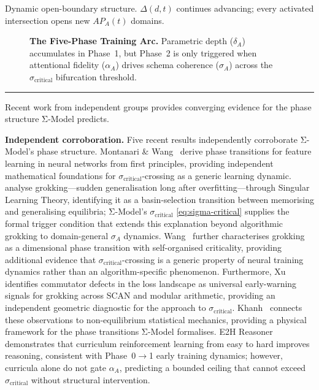 \documentclass[11pt,a4paper]{article}
\begin{document}
Dynamic open-boundary structure. $\Delta(d,t)$ continues advancing;
every activated intersection opens new $AP_A(t)$ domains.

\begin{figure}[htbp]
\centering
\resizebox{\textwidth}{!}{}
\caption{\textbf{The Five-Phase Training Arc.} Parametric depth
($\delta_A$) accumulates in Phase~1, but Phase~2 is only triggered when
attentional fidelity ($\alpha_A$) drives schema coherence ($\sigma_A$)
across the $\sigma_{\text{critical}}$ bifurcation threshold.}
\label{fig:phases}
\end{figure}

\noindent\rule{\linewidth}{0.4pt}

Recent work from independent groups provides converging evidence for the phase structure Σ-Model predicts.

\textbf{Independent corroboration.} Five recent results independently
corroborate Σ-Model's phase structure. Montanari \& Wang~\cite{montanari2026}
derive phase transitions for feature learning in neural networks from first
principles, providing independent mathematical foundations for
$\sigma_{\text{critical}}$-crossing as a generic learning dynamic.
\citet{cullen2026basinselectiongrokking} analyse grokking---sudden generalisation long after
overfitting---through Singular Learning Theory, identifying it as a basin-selection
transition between memorising and generalising equilibria;
Σ-Model's $\sigma_{\text{critical}}$ \eqref{eq:sigma-critical} supplies the
formal trigger condition that extends this explanation beyond algorithmic
grokking to domain-general $\sigma_A$ dynamics.
Wang~\cite{wang2026grokkingdimensionalphase} further characterises grokking as
a dimensional phase transition with self-organised criticality, providing
additional evidence that $\sigma_{\text{critical}}$-crossing is a generic
property of neural training dynamics rather than an algorithm-specific
phenomenon. Furthermore, Xu~\cite{xu2026earlywarning} identifies commutator
defects in the loss landscape as universal early-warning signals for grokking
across SCAN and modular arithmetic, providing an independent geometric
diagnostic for the approach to $\sigma_{\text{critical}}$.
Khanh~\cite{khanh2026phasetransitionsdriven} connects these
observations to non-equilibrium statistical mechanics, providing a physical
framework for the phase transitions Σ-Model formalises.
E2H Reasoner~\cite{e2h2025}
demonstrates that curriculum reinforcement learning from easy to hard improves
reasoning, consistent with Phase~0$\to$1 early training dynamics; however,
curricula alone do not gate $\alpha_A$, predicting a bounded ceiling that cannot
exceed $\sigma_{\text{critical}}$ without structural intervention.
\end{document}
